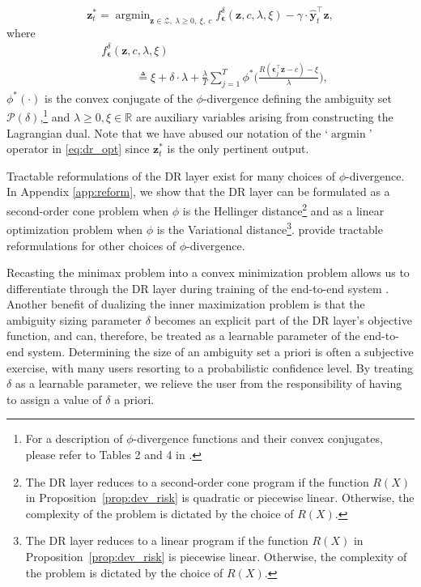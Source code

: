 \documentclass[10pt, twocolumn]{article}
\theoremstyle{plain}
\theoremstyle{definition}
\DeclareMathOperator*{\argmin}{argmin}
\begin{document}
\begin{equation}
\label{eq:dr_opt}
 \bm{z}_{t}^* = \argmin_{\bm{z}\in\mathcal{Z},\ \lambda\geq 0,\
   \xi,\ c} f_{\bm{\epsilon}}^{\delta}(\bm{z}, c, \lambda, \xi) -
    \gamma \cdot \hat{\bm{y}}_{t}^\top \bm{z},
\end{equation}
where
\begin{align}
	&f_{\bm{\epsilon}}^{\delta}(\bm{z}, c, \lambda, \xi)\nonumber \\
  	&\quad\qquad \triangleq \xi +
  	\delta\cdot \lambda + \frac{\lambda}{T} \sum_{j=1}^T \phi^*\bigg(
  	\frac{R(\bm{\epsilon}_j^\top \bm{z} - c) -
  	\xi}{\lambda}\bigg),\label{eq:dr_obj}
\end{align}
\(\phi^*(\cdot)\) is the convex conjugate of the \(\phi\)-divergence
defining the ambiguity set \(\mathcal{P}({\delta})\),\footnote{For a
description of \(\phi\)-divergence functions and their convex
conjugates, please refer to Tables 2 and 4 in \citet{ben2013robust}.}
and \(\lambda\geq 0, \xi\in\mathbb{R}\) are auxiliary variables arising
from constructing the Lagrangian dual. Note that we have abused our 
notation of the `\(\argmin\)' operator in \eqref{eq:dr_opt} since 
\(\bm{z}_{t}^*\) is the only pertinent output. 


Tractable reformulations of the DR layer exist for many choices of 
\(\phi\)-divergence. In Appendix \ref{app:reform}, we show that 
the DR layer can be formulated as 
a second-order cone problem when \(\phi\) is the Hellinger distance\footnote{The DR layer reduces to a 
second-order cone program if the function \(R(X)\) in 
Proposition~\ref{prop:dev_risk} is quadratic or piecewise linear. 
Otherwise, the complexity of the problem is dictated by the choice of 
\(R(X)\).} and as a linear optimization problem when \(\phi\) is the 
Variational distance\footnote{The DR layer 
reduces to a linear program if the function \(R(X)\) in 
Proposition~\ref{prop:dev_risk} is piecewise linear. Otherwise, the 
complexity of the problem is dictated by the choice of \(R(X)\).}.  
\citet{ben2013robust} provide tractable reformulations for other
choices of \(\phi\)-divergence.


Recasting the minimax problem into a convex minimization problem 
allows us to differentiate through the DR layer during training of the 
end-to-end system \citep{amos2017optnet, amos2019differentiable}. Another 
benefit of dualizing the inner maximization problem is that the ambiguity 
sizing parameter \(\delta\) becomes an explicit part of the DR layer's 
objective function, and can, therefore,  be treated as a learnable parameter 
of the end-to-end system. Determining the size of an ambiguity set a priori
is often a subjective exercise, with many users resorting to a probabilistic 
confidence level. By treating \(\delta\) as a learnable parameter, we relieve 
the user from the responsibility of having to assign a value of \(\delta\) a 
priori.
\end{document}
